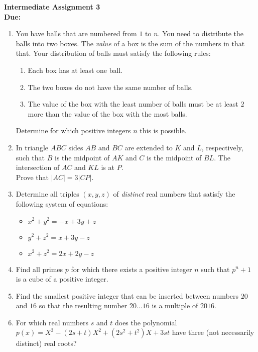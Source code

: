 \documentclass{article}
\begin{document}
	\thispagestyle{empty}
	
	\begin{center}
		\textbf{\Large Intermediate Assignment 3}
		\\ \vspace{1em}
		\textbf{\large Due: }
	\end{center}
	
	\bigskip
	\begin{enumerate}[itemsep=12pt]
		
		\item %
		You have balls that are numbered from $1$ to $n$. You need to distribute 
		the balls into two boxes. The \textit{value} of a box is the sum of the numbers in that that. Your distribution of balls must satisfy the following rules: \\ 
		\begin{enumerate}
			\item Each box has at least one ball.
			\item The two boxes do not have the same number of balls.
			\item The value of the box with the least number of balls must be at least $2$ more than the  value of the box with the most balls. 
		\end{enumerate}
	Determine for which positive integers $n$ this is possible. 
		
		
		\item %
		In triangle $ABC$ sides $AB$ and $BC$ are extended to $K$ and $L$, respectively, such that $B$ is the midpoint of $AK$ and $C$ is the midpoint of $BL$. The intersection of $AC$ and $KL$ is at $P$.
		\\ Prove that $|AC| = 3|CP|$.
		
		
		\item Determine all triples $(x,y,z)$ of \textit{distinct} real numbers that satisfy the following system of equations:
		\begin{itemize}
			\item $x^2+y^2 = -x+3y+z$
			\item $y^2+z^2 = x+3y-z$
			\item $x^2+z^2 = 2x+2y-z$
		\end{itemize}
		
		\item %
		Find all primes $p$ for which there exists a positive integer $n$ such that $p^n+1$ is a cube of a positive integer.
		
		
		\item %
		Find the smallest positive integer that can be inserted between numbers $20$ and $16$ so that the resulting number $20 \dots 16$ is a multiple of $2016$.
		
		
		\item %
		For which real numbers $s$ and $t$ does the polynomial $p(x) = X^3 -(2s+t)X^2 +(2s^2+t^2)X +3st$ have three (not necessarily distinct) real roots? 
		
	\end{enumerate}
	
\end{document}

